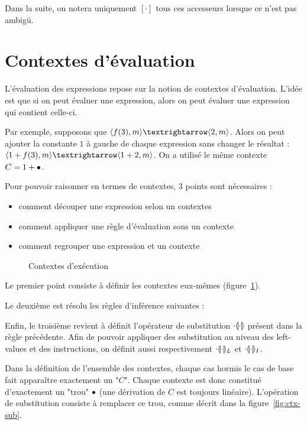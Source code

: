 Dans la suite, on notera uniquement $[\cdot]$ tous ces accesseurs lorsque ce
n'est pas ambigü.

\section{Contextes d'évaluation}

L'évaluation des expressions repose sur la notion de contextes d'évaluation.
L'idée est que si on peut évaluer une expression, alors on peut évaluer une
expression qui contient celle-ci.

Par exemple, supposons que $\mm{m}{f(3)}{m}{2}$. Alors on peut ajouter la
constante $1$ à gauche de chaque expression sans changer le résultat :
$\mm{m}{1+f(3)}{m}{1+2}$. On a utilisé le même contexte
$C = 1+\ctxEmpty$.

Pour pouvoir raisonner en termes de contextes, 3 points sont nécessaires :

\begin{itemize}
\item comment découper une expression selon un contextes
\item comment appliquer une règle d'évaluation sous un contexte
\item comment regrouper une expression et un contexte
\end{itemize}

\begin{figure}
\figctx{}

\caption{Contextes d'exécution}
\label{fig:eval-ctx}
\end{figure}

Le premier point consiste à définir les contextes eux-mêmes
(figure~\ref{fig:eval-ctx}).

Le deuxième est résolu les règles d'inférence suivantes :

\begin{mathpar}


\end{mathpar}

Enfin, le troisième revient à définit l'opérateur de substitution
$\phxx{\ctxSub}$ présent dans la règle précédente. Afin de pouvoir appliquer des
substitution au niveau des left-values et des instructions, on définit aussi
respectivement $\phxx{\ctxSubL}$ et $\phxx{\ctxSubI}$.

Dans la définition de l'ensemble des contextes, chaque cas hormis le cas de base
fait apparaître exactement un "$C$". Chaque contexte est donc constitué
d'exactement un "trou" $\ctxEmpty$ (une dérivation de $C$ est toujours
linéaire). L'opération de substitution consiste à remplacer ce trou, comme
décrit dans la figure~\ref{fig:ctx-sub}.

